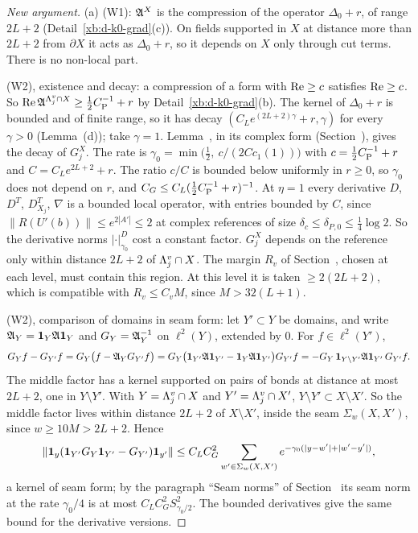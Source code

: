 \begin{proof}[New argument]
(a) (W1): $\mathfrak A^X$ is the compression of the operator $\Delta_0+r$, of range $2L+2$ (Detail~\ref{xb:d-k0-grad}(c)). On fields supported in $X$ at distance more than $2L+2$ from $\partial X$ it acts as $\Delta_0+r$, so it depends on $X$ only through cut terms. There is no non-local part.

(W2), existence and decay: a compression of a form with $\operatorname{Re}\ge c$ satisfies $\operatorname{Re}\ge c$. So $\operatorname{Re}\mathfrak A^{\Lambda^v_j\cap X}\ge\frac12C_{\rm P}^{-1}+r$ by Detail~\ref{xb:d-k0-grad}(b). The kernel of $\Delta_0+r$ is bounded and of finite range, so it has decay $(C_Le^{(2L+2)\gamma}+r,\gamma)$ for every $\gamma>0$ (Lemma~(d)); take $\gamma=1$. Lemma~, in its complex form (Section~), gives the decay of $G^X_j$. The rate is $\gamma_0=\min\big(\frac12,\ c/(2C c_1(1))\big)$ with $c=\frac12C_{\rm P}^{-1}+r$ and $C=C_Le^{2L+2}+r$. The ratio $c/C$ is bounded below uniformly in $r\ge0$, so $\gamma_0$ does not depend on $r$, and $C_G\le C_L(\frac12C_{\rm P}^{-1}+r)^{-1}$. At $\eta=1$ every derivative $D$, $D^T$, $D^T_{X_j}$, $\nabla$ is a bounded local operator, with entries bounded by $C$, since $\|R(U'(b))\|\le e^{2|A'|}\le2$ at complex references of size $\delta_c\le\delta_{P,0}\le\frac14\log2$. So the derivative norms $|\cdot|^D_{\gamma_0}$ cost a constant factor. $G^X_j$ depends on the reference only within distance $2L+2$ of $\Lambda^v_j\cap X$. The margin $R_v$ of Section~, chosen at each level, must contain this region. At this level it is taken $\ge2(2L+2)$, which is compatible with $R_v\le C_vM$, since $M>32(L+1)$.

(W2), comparison of domains in seam form: let $Y'\subset Y$ be domains, and write $\mathfrak A_Y=\mathbf 1_Y\mathfrak A\mathbf 1_Y$ and $G_Y=\mathfrak A_Y^{-1}$ on $\ell^2(Y)$, extended by $0$. For $f\in\ell^2(Y')$,
\[
G_Yf-G_{Y'}f=G_Y\big(f-\mathfrak A_YG_{Y'}f\big)=G_Y\big(\mathbf 1_{Y'}\mathfrak A\mathbf 1_{Y'}-\mathbf 1_Y\mathfrak A\mathbf 1_{Y'}\big)G_{Y'}f=-G_Y\,\mathbf 1_{Y\setminus Y'}\mathfrak A\mathbf 1_{Y'}\,G_{Y'}f .
\]
The middle factor has a kernel supported on pairs of bonds at distance at most $2L+2$, one in $Y\setminus Y'$. With $Y=\Lambda^v_j\cap X$ and $Y'=\Lambda^v_j\cap X'$, $Y\setminus Y'\subset X\setminus X'$. So the middle factor lives within distance $2L+2$ of $X\setminus X'$, inside the seam $\Sigma_w(X,X')$, since $w\ge10M>2L+2$. Hence
\[
\|\mathbf 1_y(\mathbf 1_{Y'}G_Y\mathbf 1_{Y'}-G_{Y'})\mathbf 1_{y'}\|\le C_LC_G^2\sum_{w'\in\Sigma_w(X,X')}e^{-\gamma_0(|y-w'|+|w'-y'|)},
\]
a kernel of seam form; by the paragraph ``Seam norms'' of Section~ its seam norm at the rate $\gamma_0/4$ is at most $C_LC_G^2S^2_{\gamma_0/2}$. The bounded derivatives give the same bound for the derivative versions.


\end{proof}
